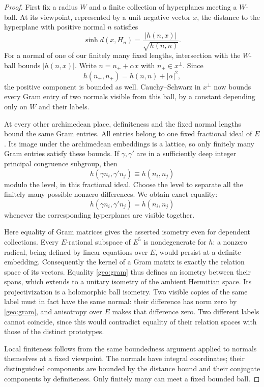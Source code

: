 \begin{proof}
First fix a radius $W$ and a finite collection of hyperplanes meeting a
$W$-ball.  At its viewpoint, represented by a unit negative
vector $x$, the distance to the hyperplane with positive normal $n$
satisfies
\[
  \sinh d(x,H_n)=\frac{|h(n,x)|}{\sqrt{h(n,n)}}.
\]
For a normal of one of our finitely many fixed lengths, intersection
with the $W$-ball bounds $|h(n,x)|$.  Write $n=n_++\alpha x$ with
$n_+\in x^\perp$.  Since
\[
 h(n_+,n_+)=h(n,n)+|\alpha|^2,
\]
the positive component is bounded as well.  Cauchy--Schwarz in
$x^\perp$ now bounds every Gram entry of two normals visible from this
ball, by a constant depending only on $W$ and their labels.

At every other archimedean place, definiteness and the fixed normal
lengths bound the same Gram entries.  All entries belong to one fixed
fractional ideal of $E$.  Its image under the archimedean embeddings
is a lattice, so only finitely many Gram entries satisfy these bounds.
If $\gamma,\gamma'$ are in a sufficiently deep integer principal
congruence subgroup, then
\[
 h(\gamma n_i,\gamma'n_j)\equiv h(n_i,n_j)
\]
modulo the level, in this fractional ideal.  Choose the level to
separate all the finitely many possible nonzero differences.  We obtain
exact equality:
\begin{equation}\label{geo:gram}
            h(\gamma n_i,\gamma'n_j)=h(n_i,n_j)
\end{equation}
whenever the corresponding hyperplanes are visible together.

Here equality of Gram matrices gives the asserted isometry even for
dependent collections.  Every $E$-rational subspace of $E^5$ is
nondegenerate for $h$: a nonzero radical, being defined by linear
equations over $E$, would persist at a definite embedding.  Consequently
the kernel of a Gram matrix is exactly the relation space of its
vectors.  Equality \eqref{geo:gram} thus defines an isometry between
their spans, which extends to a unitary isometry of the ambient
Hermitian space.  Its projectivization is a holomorphic ball isometry.
Two visible copies of the same label must in fact have the same normal:
their difference has norm zero by \eqref{geo:gram}, and anisotropy over
$E$ makes that difference zero.  Two different labels cannot coincide,
since this would contradict equality of their relation spaces with
those of the distinct prototypes.

Local finiteness follows from the same boundedness argument applied to
normals themselves at a fixed viewpoint.  The normals have integral
coordinates; their distinguished components are bounded by the distance
bound and their conjugate components by definiteness.  Only finitely
many can meet a fixed bounded ball.


\end{proof}
